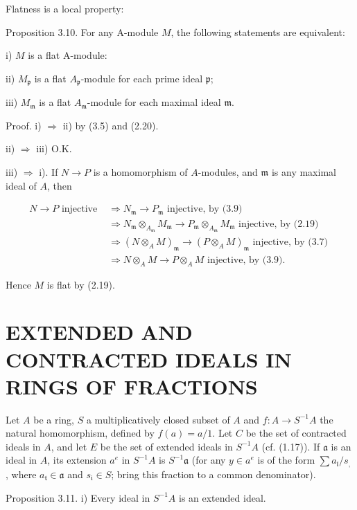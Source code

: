\documentclass{standalone}
\theoremstyle{definition}
\theoremstyle{remark}
\begin{document}
Flatness is a local property:

Proposition 3.10. For any A-module $M$, the following statements are equivalent:

i) $M$ is a flat A-module:

ii) $M_{\mathfrak{p}}$ is a flat $A_{\mathfrak{p}}$-module for each prime ideal $\mathfrak{p}$;

iii) $M_{\mathfrak{m}}$ is a flat $A_{\mathfrak{m}}$-module for each maximal ideal $\mathfrak{m}$.

Proof. i) $\Rightarrow$ ii) by (3.5) and (2.20).

ii) $\Rightarrow$ iii) O.K.

iii) $\Rightarrow$ i). If $N \rightarrow P$ is a homomorphism of $A$-modules, and $\mathfrak{m}$ is any maximal ideal of $A$, then

\[
\begin{aligned}
N \rightarrow P \text { injective } & \Rightarrow N_{\mathfrak{m}} \rightarrow P_{\mathfrak{m}} \text { injective, by (3.9) } \\
& \Rightarrow N_{\mathfrak{m}} \otimes_{A_{\mathfrak{m}}} M_{\mathfrak{m}} \rightarrow P_{\mathfrak{m}} \otimes_{A_{\mathfrak{m}}} M_{\mathfrak{m}} \text { injective, by (2.19) } \\
& \Rightarrow\left(N \otimes_{A} M\right)_{\mathfrak{m}} \rightarrow\left(P \otimes_{A} M\right)_{\mathfrak{m}} \text { injective, by (3.7) } \\
& \Rightarrow N \otimes_{A} M \rightarrow P \otimes_{A} M \text { injective, by (3.9). }
\end{aligned}
\]

Hence $M$ is flat by (2.19).

\section{EXTENDED AND CONTRACTED IDEALS IN RINGS OF FRACTIONS}
Let $A$ be a ring, $S$ a multiplicatively closed subset of $A$ and $f: A \rightarrow S^{-1} A$ the natural homomorphism, defined by $f(a)=a / 1$. Let $C$ be the set of contracted ideals in $A$, and let $E$ be the set of extended ideals in $S^{-1} A$ (cf. (1.17)). If $\mathfrak{a}$ is an ideal in $A$, its extension $a^{e}$ in $S^{-1} A$ is $S^{-1} \mathfrak{a}$ (for any $y \in a^{e}$ is of the form $\sum a_{\mathfrak{l}} / s_{\text {, }}$, where $a_{\mathfrak{t}} \in \mathfrak{a}$ and $s_{\mathfrak{i}} \in S$; bring this fraction to a common denominator).

Proposition 3.11. i) Every ideal in $S^{-1} A$ is an extended ideal.
\end{document}
